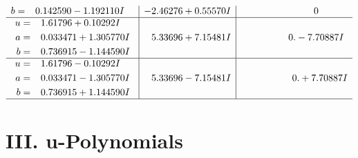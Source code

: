 \documentclass[1p]{elsarticle_modified}
\theoremstyle{definition}
\begin{document}
$$\begin{array}{c|c|c}
\begin{aligned}
b &= \phantom{-}0.142590 - 1.192110 I\end{aligned}
 & -2.46276 + 0.55570 I & \phantom{-0.000000 } 0 \\ \hline\begin{aligned}
u &= \phantom{-}1.61796 + 0.10292 I \\
a &= \phantom{-}0.033471 + 1.305770 I \\
b &= \phantom{-}0.736915 - 1.144590 I\end{aligned}
 & \phantom{-}5.33696 + 7.15481 I & \phantom{-0.000000 } 0. - 7.70887 I \\ \hline\begin{aligned}
u &= \phantom{-}1.61796 - 0.10292 I \\
a &= \phantom{-}0.033471 - 1.305770 I \\
b &= \phantom{-}0.736915 + 1.144590 I\end{aligned}
 & \phantom{-}5.33696 - 7.15481 I & \phantom{-0.000000 -}0. + 7.70887 I\\
 \hline 
 \end{array}$$\newpage
\newpage\renewcommand{\arraystretch}{1}
\centering \section*{ III. u-Polynomials}
\end{document}
